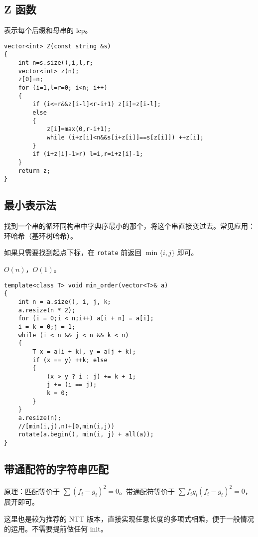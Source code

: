 \documentclass[12pt]{ctexart}
\begin{document}
\subsection{Z 函数}

表示每个后缀和母串的 lcp。

\begin{lstlisting}
vector<int> Z(const string &s)
{
	int n=s.size(),i,l,r;
	vector<int> z(n);
	z[0]=n;
	for (i=1,l=r=0; i<n; i++)
	{
		if (i<=r&&z[i-l]<r-i+1) z[i]=z[i-l];
		else
		{
			z[i]=max(0,r-i+1);
			while (i+z[i]<n&&s[i+z[i]]==s[z[i]]) ++z[i];
		}
		if (i+z[i]-1>r) l=i,r=i+z[i]-1;
	}
	return z;
}
\end{lstlisting}



\subsection{最小表示法}

找到一个串的循环同构串中字典序最小的那个，将这个串直接变过去。常见应用：环哈希（基环树哈希）。

如果只需要找到起点下标，在 \verb|rotate| 前返回 $\min\{i,j\}$ 即可。

$O(n)$，$O(1)$。

\begin{lstlisting}
template<class T> void min_order(vector<T>& a)
{
	int n = a.size(), i, j, k;
	a.resize(n * 2);
	for (i = 0;i < n;i++) a[i + n] = a[i];
	i = k = 0;j = 1;
	while (i < n && j < n && k < n)
	{
		T x = a[i + k], y = a[j + k];
		if (x == y) ++k; else
		{
			(x > y ? i : j) += k + 1;
			j += (i == j);
			k = 0;
		}
	}
	a.resize(n);
	//[min(i,j),n)+[0,min(i,j))
	rotate(a.begin(), min(i, j) + all(a));
}
\end{lstlisting}
\subsection{带通配符的字符串匹配}

原理：匹配等价于 $\sum (f_i-g_i)^2=0$。带通配符等价于 $\sum f_ig_i(f_i-g_i)^2=0$，展开即可。

这里也是较为推荐的 NTT 版本，直接实现任意长度的多项式相乘，便于一般情况的运用。不需要提前做任何 init。
\end{document}

